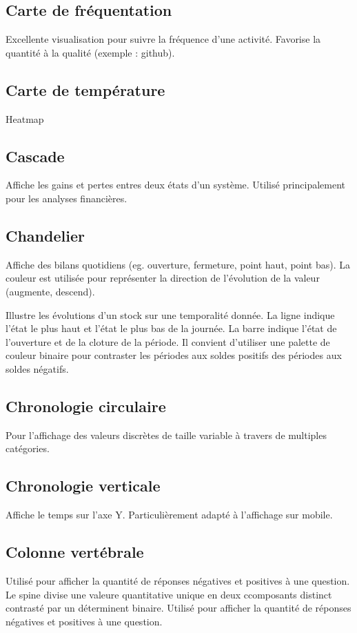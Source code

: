 \documentclass[a4paper,12pt]{article}
\begin{document}
\begin{multicols}{2}
\subsection*{Carte de fréquentation}
\label{sec:orgbd43f58}
Excellente visualisation pour suivre la fréquence d'une activité. Favorise la quantité à la qualité (exemple : github). \autocite{alansmithLexiqueVisuel}
\subsection*{Carte de température}
\label{sec:org67dedb5}

Heatmap
\subsection*{Cascade}
\label{sec:org223cea8}
Affiche les gains et pertes entres deux états d'un système. \autocite{jonathanschwabishComparingCategories2021} Utilisé principalement pour les analyses financières. \autocite{alansmithLexiqueVisuel}
\subsection*{Chandelier}
\label{sec:orga889b58}
Affiche des bilans quotidiens (eg. ouverture, fermeture, point haut, point bas). \autocite{alansmithLexiqueVisuel}
La couleur est utilisée pour représenter la direction de l'évolution de la valeur (augmente, descend).

Illustre les évolutions d'un stock sur une temporalité donnée. La ligne indique l'état le plus haut et l'état le plus bas de la journée. La barre indique l'état de l'ouverture et de la cloture de la période. \autocite{jonathanschwabishDistribution2021} Il convient d'utiliser une palette de couleur binaire pour contraster les périodes aux soldes positifs des périodes aux soldes négatifs.
\subsection*{Chronologie circulaire}
\label{sec:org39e0edc}
Pour l'affichage des valeurs discrètes de taille variable à travers de multiples catégories. \autocite{alansmithLexiqueVisuel}
\subsection*{Chronologie verticale}
\label{sec:orgaa53810}
Affiche le temps sur l'axe Y. Particulièrement adapté à l'affichage sur mobile. \autocite{alansmithLexiqueVisuel}
\subsection*{Colonne vertébrale}
\label{sec:org7db0c2e}
Utilisé pour afficher la quantité de réponses négatives et positives à une question. Le spine divise une valeure quantitative unique en deux ccomposants distinct contrasté par un déterminent binaire. \autocite{alansmithLexiqueVisuel} Utilisé pour afficher la quantité de réponses négatives et positives à une question.

\end{multicols}
\end{document}
